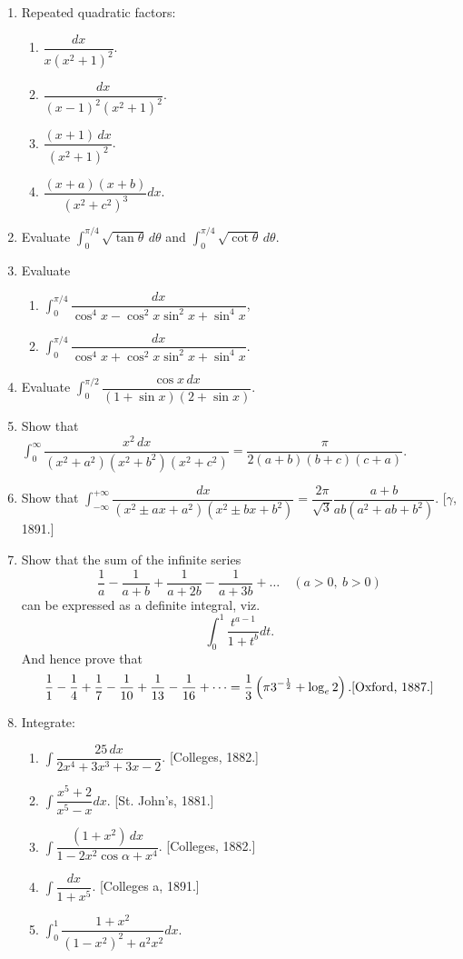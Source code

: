 \documentclass[11pt, a4paper]{article}
\newcommand{\source}[1]{\hfill\textnormal{[#1]}}
\begin{document}
\begin{enumerate}[leftmargin=2em]
\item Repeated quadratic factors:
\begin{enumerate}[label=(\roman*)]
\item $\dfrac{dx}{x(x^2+1)^2}$.
\item $\dfrac{dx}{(x-1)^2(x^2+1)^2}$.
\item $\dfrac{(x+1)\,dx}{(x^2+1)^2}$.
\item $\dfrac{(x+a)(x+b)}{(x^2+c^2)^3}dx$.
\end{enumerate}

\item Evaluate $\displaystyle\int_0^{\pi/4}\sqrt{\tan\theta}\,d\theta$ and $\displaystyle\int_0^{\pi/4}\sqrt{\cot\theta}\,d\theta$.

\item Evaluate
\begin{enumerate}[label=(\roman*)]
\item $\displaystyle\int_0^{\pi/4} \dfrac{dx}{\cos^4x-\cos^2x\sin^2x+\sin^4x}$,
\item $\displaystyle\int_0^{\pi/4} \dfrac{dx}{\cos^4x+\cos^2x\sin^2x+\sin^4x}$.
\end{enumerate}

\item Evaluate $\displaystyle\int_0^{\pi/2} \dfrac{\cos x\,dx}{(1+\sin x)(2+\sin x)}$.

\item Show that $\displaystyle\int_0^\infty \dfrac{x^2\,dx}{(x^2+a^2)(x^2+b^2)(x^2+c^2)}=\dfrac{\pi}{2(a+b)(b+c)(c+a)}$.

\item Show that $\displaystyle\int_{-\infty}^{+\infty} \dfrac{dx}{(x^2\pm ax+a^2)(x^2\pm bx+b^2)}=\dfrac{2\pi}{\sqrt3}\dfrac{a+b}{ab(a^2+ab+b^2)}$. \source{$\gamma$, 1891.}

\item Show that the sum of the infinite series
\[
\dfrac{1}{a}-\dfrac{1}{a+b}+\dfrac{1}{a+2b}-\dfrac{1}{a+3b}+\dots \quad (a>0,\ b>0)
\]
can be expressed as a definite integral, viz.
\[
\int_0^1 \dfrac{t^{a-1}}{1+t^b}dt.
\]
And hence prove that
\[
\dfrac11-\dfrac14+\dfrac17-\dfrac{1}{10}+\dfrac{1}{13}-\dfrac{1}{16}+\dots = \dfrac13\left(\pi 3^{-\frac12}+\log_e 2\right). \source{Oxford, 1887.}
\]

\item Integrate:
\begin{enumerate}[label=(\roman*)]
\item $\displaystyle\int \dfrac{25\,dx}{2x^4+3x^3+3x-2}$. \source{Colleges, 1882.}
\item $\displaystyle\int \dfrac{x^5+2}{x^5-x}dx$. \source{St. John's, 1881.}
\item $\displaystyle\int \dfrac{(1+x^2)\,dx}{1-2x^2\cos\alpha+x^4}$. \source{Colleges, 1882.}
\item $\displaystyle\int \dfrac{dx}{1+x^5}$. \source{Colleges a, 1891.}
\item $\displaystyle\int_0^1 \dfrac{1+x^2}{(1-x^2)^2+a^2x^2}dx$.
\end{enumerate}


\end{enumerate}
\end{document}

